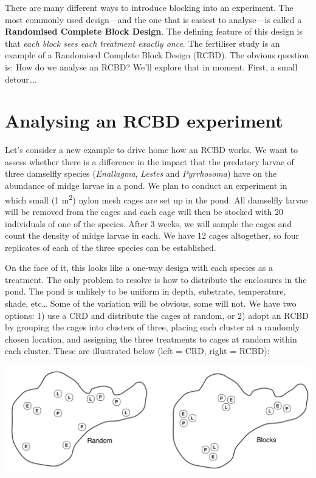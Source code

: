 \documentclass[
]{book}
\begin{document}
There are many different ways to introduce blocking into an experiment. The most commonly used design---and the one that is easiest to analyse---is called a \textbf{Randomised Complete Block Design}. The defining feature of this design is that \emph{each block sees each treatment exactly once}. The fertiliser study is an example of a Randomised Complete Block Design (RCBD). The obvious question is: How do we analyse an RCBD? We'll explore that in moment. First, a small detour\ldots.

\hypertarget{analysing-an-rcbd-experiment}{%
\section{Analysing an RCBD experiment}\label{analysing-an-rcbd-experiment}}

Let's consider a new example to drive home how an RCBD works. We want to assess whether there is a difference in the impact that the predatory larvae of three damselfly species (\emph{Enallagma}, \emph{Lestes} and \emph{Pyrrhosoma}) have on the abundance of midge larvae in a pond. We plan to conduct an experiment in which small (1 m\textsuperscript{2}) nylon mesh cages are set up in the pond. All damselfly larvae will be removed from the cages and each cage will then be stocked with 20 individuals of one of the species. After 3 weeks, we will sample the cages and count the density of midge larvae in each. We have 12 cages altogether, so four replicates of each of the three species can be established.

On the face of it, this looks like a one-way design with each species as a treatment. The only problem to resolve is how to distribute the enclosures in the pond. The pond is unlikely to be uniform in depth, substrate, temperature, shade, etc\ldots{} Some of the variation will be obvious, some will not. We have two options: 1) use a CRD and distribute the cages at random, or 2) adopt an RCBD by grouping the cages into clusters of three, placing each cluster at a randomly chosen location, and assigning the three treatments to cages at random within each cluster. These are illustrated below (left = CRD, right = RCBD):

\begin{center}\includegraphics[width=0.75\linewidth]{./images/damselfly-expt-layouts} \end{center}
\end{document}
